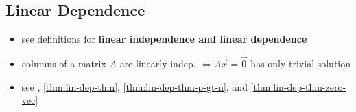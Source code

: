 \documentclass[a4paper,12pt]{article}
\theoremstyle{definition}
\theoremstyle{definition}
\newcommand{\mateq}[3]{#1#2 = #3}
\begin{document}
	\subsection{Linear Dependence}
	\begin{itemize}
		\item see definitions for \textbf{linear independence and linear dependence}
		
		\item columns of a matrix $A$ are linearly indep. $\Leftrightarrow \mateq{A}{\vec{x}}{\vec{0}}$ has only trivial solution
		
		\item see , \autoref{thm:lin-dep-thm}, \autoref{thm:lin-dep-thm-p-gt-n}, and \autoref{thm:lin-dep-thm-zero-vec}
	\end{itemize}
	
\end{document}
